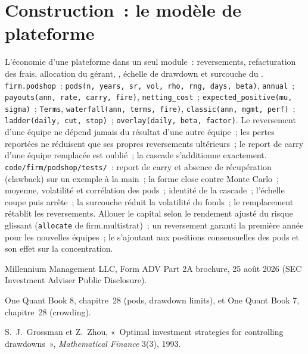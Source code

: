\section{Construction~: le modèle de plateforme}\label{bld:fm:the-multi-manager-platform:podshop}

\begin{build}
 L'économie d'une plateforme dans un seul module~: reversements, refacturation des frais, allocation du gérant, , échelle de drawdown et
surcouche du .
 \texttt{firm.podshop}~: \texttt{pods(n, years, sr, vol, rho, rng, days, beta)}, \texttt{annual}~;
\texttt{payouts(ann, rate, carry, fire)}, \texttt{netting\_cost}~; \texttt{expected\_positive(mu, sigma)}~; \texttt{Terms}, \texttt{waterfall(ann, terms, fire)},
\texttt{classic(ann, mgmt, perf)}~; \texttt{ladder(daily, cut, stop)}~; \texttt{overlay(daily, beta, factor)}.
 Le reversement d'une équipe ne dépend jamais du résultat d'une autre équipe~; les pertes reportées ne réduisent que ses propres reversements ultérieurs~; le report de carry d'une équipe remplacée est
oublié~; la cascade s'additionne exactement.
 \texttt{code/firm/podshop/tests/}~: report de carry et absence de récupération (clawback) sur un exemple à la main~; la forme close contre Monte
Carlo~; moyenne, volatilité et corrélation des pods~; identité de la cascade~; l'échelle coupe puis arrête~; la surcouche réduit la volatilité du fonds~; le remplacement
rétablit les reversements.
 Allouer le capital selon le rendement ajusté du risque glissant (\texttt{allocate} de firm.multistrat)~; un reversement garanti la première année pour les nouvelles
équipes~; le  s'ajoutant aux positions consensuelles des pods et son effet sur la concentration.
\end{build}

\begin{omsources}
\item Millennium Management LLC, Form ADV Part 2A brochure, 25 août 2026 (SEC Investment Adviser Public Disclosure).
\item One Quant Book 8, chapitre~28 (pods, drawdown limits), et One Quant Book 7, chapitre~28 (crowding).
\item S.~J.~Grossman et Z.~Zhou, «~Optimal investment strategies for controlling drawdowns~», \emph{Mathematical Finance} 3(3), 1993.
\end{omsources}

